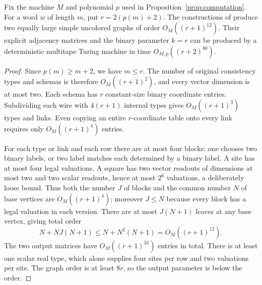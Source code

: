 \begin{proposition}\label{prop:uniform-general}
Fix the machine $M$ and polynomial $p$ used in
Proposition~\ref{prop:computation}. For a word $w$ of length $m$, put
$r=2(p(m)+2)$. The constructions of
produce two equally large simple uncolored
graphs of order $O_M((r+1)^{12})$. Their explicit adjacency matrices and the
binary parameter $k=r$ can be produced by a deterministic multitape Turing
machine in time $O_{M,p}((r+2)^{80})$.
\end{proposition}
\begin{proof}
Since $p(m)\ge m+2$, we have $m\le r$. The number of original consistency
types and schemas is therefore $O_M((r+1)^2)$, and every vector dimension is
at most two. Each schema has $r$ constant-size binary coordinate entries.
Subdividing each wire with $4(r+1)$ internal types gives
$O_M((r+1)^3)$ types and links. Even copying an entire $r$-coordinate table
onto every link requires only $O_M((r+1)^4)$ entries.

For each type or link and each row there are at most four blocks: one chooses
two binary labels, or two label matches each determined by a binary label.
A site has at most four legal valuations. A square has two vector readouts
of dimensions at most two and two scalar readouts, hence at most $2^6$
valuations, a deliberately loose bound. Thus both the number $J$ of blocks
and the common number $N$ of base vertices are $O_M((r+1)^4)$; moreover
$J\le N$ because every block has a legal valuation in each version.
There are at most $J(N+1)$ leaves at any base vertex, giving total order
\begin{equation}\label{eq:graph-order-bound}
 N+NJ(N+1)\le N+N^2(N+1)=O_M((r+1)^{12}).
\end{equation}
The two output matrices have $O_M((r+1)^{24})$ entries in total.
There is at least one scalar real type, which alone supplies four sites per
row and two valuations per site. The graph order is at least $8r$, so the
output parameter is below the order.


\end{proof}
